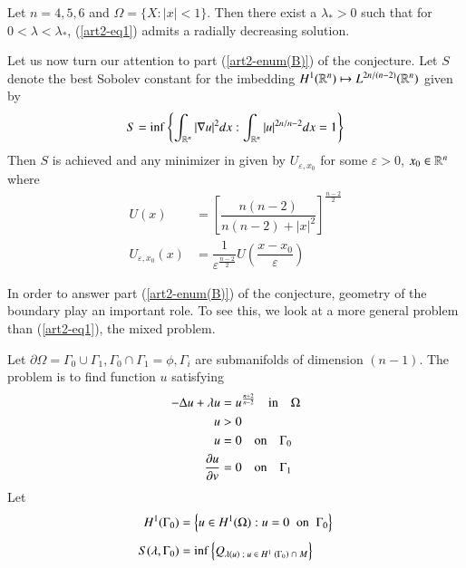 \begin{theorem}
Let $n= 4, 5, 6$ and $\Omega = \{X: |x|< 1\}$. Then there exist a $\lambda_{*} > 0$ such that for $0 < \lambda < \lambda_{*}$, (\ref{art2-eq1}) admits a radially decreasing solution.

Let us now turn our attention to part (\ref{art2-enum(B)}) of the conjecture. Let $S$ denote the best Sobolev constant for the imbedding $H^{1}(\mathbb{R}^{n}) \mapsto  L^{2n/(n-2)}(\mathbb{R}^{n})$ given by  
\begin{equation}
S = {\rm inf}\left\{ \int_{\mathbb{R}^{n}} |\nabla u|^{2}dx: \int_{\mathbb{R}^{n}} |u|^{2n/n-2}dx =1 \right \}\label{art2-eq4}
\end{equation}
Then $S$ is achieved and any minimizer in given by $U_{\varepsilon, x_{0}}$ for some $\varepsilon > 0$, $x_{0} \in \mathbb{R}^{n}$ where
\begin{align}
U(x) &= \left[ \dfrac{n(n-2)}{n(n-2)+|x|^{2}}\right]^{\frac{n-2}{2}}\label{art2-eq5}\\
U_{\varepsilon, x_{0}}(x) &= \dfrac{1}{\varepsilon^{\frac{n-2}{2}}}U \left(\dfrac{x-x_{0}}{\varepsilon}\right)\label{art2-eq6}
\end{align}   
\end{theorem}

In order to answer part ({\ref{art2-enum(B)}}) of the conjecture, geometry of the boundary play an important role. To see this, we look at a more general problem than (\ref{art2-eq1}), the mixed problem.

Let $\partial \Omega = \Gamma_{0}\cup  \Gamma_{1}, \Gamma_{0} \cap \Gamma_{1} = \phi, \Gamma_{i}$ are submanifolds of dimension $(n-1)$. The problem is to find function $u$ satisfying
 \begin{align}
-\Delta u + \lambda u &= u ^{\frac{n+2}{n-2}} \quad {\rm in}\quad \Omega\nonumber\\
u &> 0 \nonumber\\
u &= 0 \quad {\rm on}\quad \Gamma_{0}\label {art2-eq7}\\
\dfrac{\partial u}{\partial v} &= 0 \quad {\rm on}  \quad\Gamma_{1} \nonumber     
 \end{align}
Let
\begin{align}
H^{1}(\Gamma_{0}) &= \left\{u \in H^{1}(\Omega) : u = 0\;\; {\rm on}\;\; \Gamma_{0}\right\}\label{art2-eq8}\\[4pt]
S(\lambda, \Gamma_{0}) &= {\rm inf}\left\{Q_{\lambda(u) \;; \;u \;\in\; H^{1}\; (\Gamma_{0})\; \cap\; M}\right\}\label{art2-eq9}
\end{align} 

